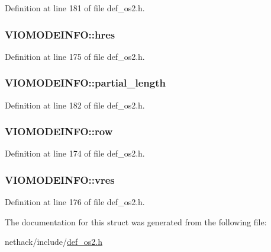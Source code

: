 Definition at line 181 of file def\+\_\+os2.\+h.

\hypertarget{structVIOMODEINFO_a3258514160c07a36e40b534530c12a1e}{
\subsubsection[{hres}]{ V\+I\+O\+M\+O\+D\+E\+I\+N\+F\+O\+::hres}}\label{structVIOMODEINFO_a3258514160c07a36e40b534530c12a1e}


Definition at line 175 of file def\+\_\+os2.\+h.

\hypertarget{structVIOMODEINFO_a594e87263b6d121f2c1aae05c0a0079a}{
\subsubsection[{partial\+\_\+length}]{ V\+I\+O\+M\+O\+D\+E\+I\+N\+F\+O\+::partial\+\_\+length}}\label{structVIOMODEINFO_a594e87263b6d121f2c1aae05c0a0079a}


Definition at line 182 of file def\+\_\+os2.\+h.

\hypertarget{structVIOMODEINFO_a6d0d195c623566d400856ead2f5fbc3e}{
\subsubsection[{row}]{ V\+I\+O\+M\+O\+D\+E\+I\+N\+F\+O\+::row}}\label{structVIOMODEINFO_a6d0d195c623566d400856ead2f5fbc3e}


Definition at line 174 of file def\+\_\+os2.\+h.

\hypertarget{structVIOMODEINFO_aac092b75ab712f4a6ab11fc6f267ac29}{
\subsubsection[{vres}]{ V\+I\+O\+M\+O\+D\+E\+I\+N\+F\+O\+::vres}}\label{structVIOMODEINFO_aac092b75ab712f4a6ab11fc6f267ac29}


Definition at line 176 of file def\+\_\+os2.\+h.



The documentation for this struct was generated from the following file\+:\begin{DoxyCompactItemize}
\item 
nethack/include/\hyperlink{def__os2_8h}{def\+\_\+os2.\+h}\end{DoxyCompactItemize}
